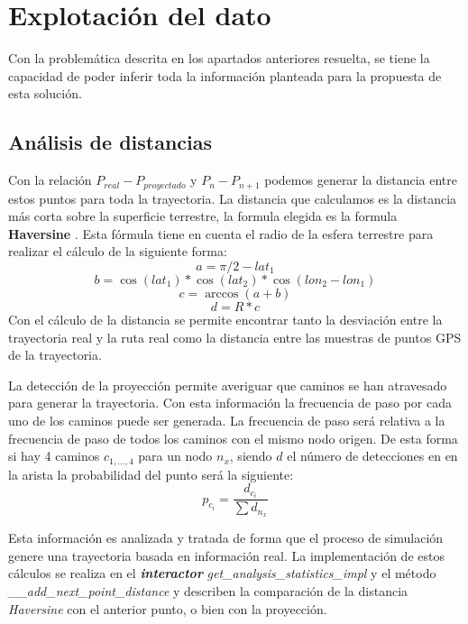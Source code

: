 \section{Explotación del dato}
\label{section:ExplotacionDato}
Con la problemática descrita en los apartados anteriores resuelta, se tiene la capacidad 
de poder inferir toda la información planteada para la propuesta de esta solución.

\subsection{Análisis de distancias}
\label{section: AnalisisDistancias}
Con la relación $P_{real} - P_{proyectado}$ y $P_{n} - P_{n+1}$ podemos generar la 
distancia entre estos puntos para toda la trayectoria. La distancia que calculamos es la 
distancia más corta sobre la superficie terrestre, la formula elegida es la formula 
\textbf{Haversine} \cite{Gis01} \cite{Haver01}. Esta fórmula tiene en cuenta el radio de 
la esfera terrestre para realizar el cálculo de la siguiente forma:
\begin{equation}
a = \pi/2 - lat_{1}
\end{equation}
\begin{equation}
b = \cos(lat_{1}) * \cos(lat_{2}) * \cos(lon_{2} - lon_{1})
\end{equation}
\begin{equation}
c = \arccos(a + b)
\end{equation}
\begin{equation}
d = R * c
\end{equation}
Con el cálculo de la distancia se permite encontrar tanto la desviación entre la 
trayectoria real y la ruta real como la distancia entre las muestras de puntos \ac{GPS} 
de la trayectoria.

La detección de la proyección permite averiguar que caminos se han atravesado para 
generar la trayectoria. Con esta información la frecuencia de paso por cada uno de los
caminos puede ser generada. La frecuencia de paso será relativa a la frecuencia de 
paso de todos los caminos con el mismo nodo origen. De esta forma si hay 4 caminos 
$c_{1,...,4}$ para un nodo $n_{x}$, siendo $d$ el número de detecciones en en la arista 
la probabilidad del punto será la siguiente:
\begin{equation}
p_{c_{i}} = \frac{d_{c_{i}}}{\sum{d_{n_{x}}}}
\end{equation}


Esta información es analizada y tratada de forma que el proceso de simulación genere 
una trayectoria basada en información real. La implementación de estos cálculos se 
realiza en el \textbf{\textit{interactor}} \textit{get\_analysis\_statistics\_impl} y el método 
\textit{\_\_add\_next\_point\_distance} y describen la comparación de la distancia 
\textit{Haversine} con el anterior punto, o bien con la proyección.

